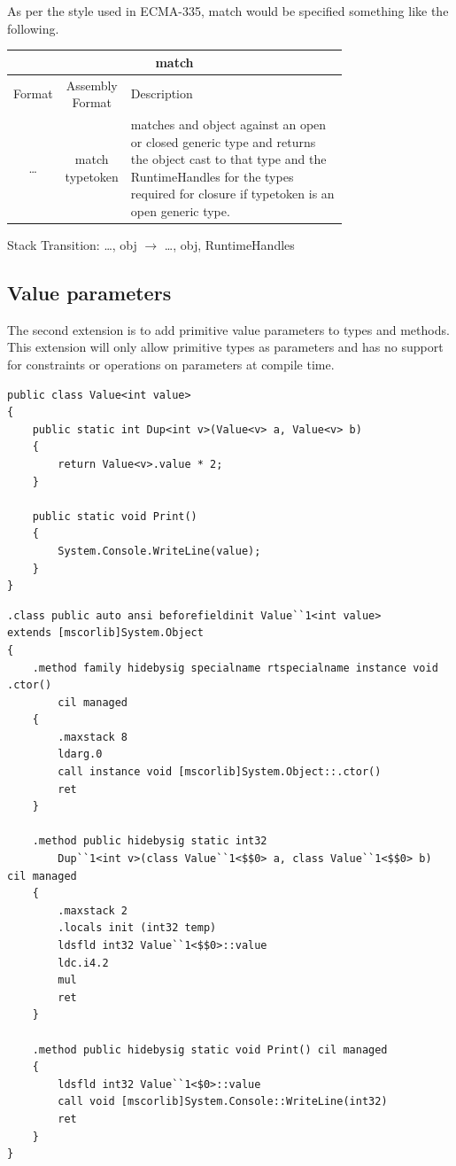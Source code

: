 \documentclass[english]{report}
\begin{document}
As per the style used in ECMA-335, match would be specified something
like the following.

\begin{tabular}{|c|c|>{\centering}p{0.75\linewidth}|}
\hline 
\multicolumn{3}{|c}{match}\tabularnewline
\hline 
\hline 
Format & Assembly Format & Description\tabularnewline
\hline 
\ldots{} & match typetoken & matches and object against an open or closed generic type and returns
the object cast to that type and the RuntimeHandles for the types
required for closure if typetoken is an open generic type.\tabularnewline
\hline 
\end{tabular}

Stack Transition: \ldots{}, obj $\rightarrow$ \ldots{}, obj, RuntimeHandles


\subsection{Value parameters}

The second extension is to add primitive value parameters to types
and methods. This extension will only allow primitive types as parameters
and has no support for constraints or operations on parameters at
compile time.

\begin{lstlisting}[caption={Value parameters in extended C\#},keywordstyle={\color{blue}},language=sharpc]
public class Value<int value>
{
	public static int Dup<int v>(Value<v> a, Value<v> b)
	{
		return Value<v>.value * 2;
	}

	public static void Print()
	{
		System.Console.WriteLine(value);
	}
}
\end{lstlisting}


\begin{lstlisting}[caption={Corresponding CIL},language=cil]
.class public auto ansi beforefieldinit Value``1<int value>
extends [mscorlib]System.Object 
{
	.method family hidebysig specialname rtspecialname instance void .ctor() 
		cil managed
	{
		.maxstack 8
		ldarg.0
		call instance void [mscorlib]System.Object::.ctor()
		ret
	}

	.method public hidebysig static int32 
		Dup``1<int v>(class Value``1<$$0> a, class Value``1<$$0> b) cil managed
	{
		.maxstack 2
		.locals init (int32 temp)
		ldsfld int32 Value``1<$$0>::value
		ldc.i4.2 
		mul
		ret
	}

	.method public hidebysig static void Print() cil managed
	{
		ldsfld int32 Value``1<$0>::value
		call void [mscorlib]System.Console::WriteLine(int32)
		ret
	}
}
\end{lstlisting}
\end{document}
